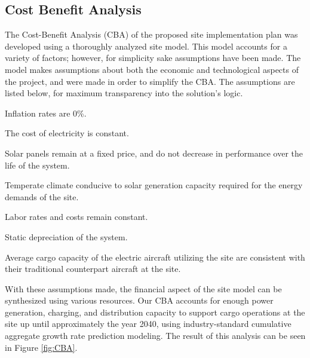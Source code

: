 \documentclass[../main.tex]{subfiles}
\begin{document}
\subsection{Cost Benefit Analysis} %
The Cost-Benefit Analysis (CBA) of the proposed site implementation plan was developed using a thoroughly analyzed site model. This model accounts for a variety of factors; however, for simplicity sake assumptions have been made. The model makes assumptions about both the economic and technological aspects of the project, and were made in order to simplify the CBA. The assumptions are listed below, for maximum transparency into the solution's logic.
\begin{enumerate}
\begin{singlespace}
    \item Inflation rates are 0\%.
    \item The cost of electricity is constant.
    \item Solar panels remain at a fixed price, and do not decrease in performance over the life of the system.
    \item Temperate climate conducive to solar generation capacity required for the energy demands of the site.
    \item Labor rates and costs remain constant.
    \item Static depreciation of the system.
    \item Average cargo capacity of the electric aircraft utilizing the site are consistent with their traditional counterpart aircraft at the site.
\end{singlespace}
\end{enumerate}

With these assumptions made, the financial aspect of the site model can be synthesized using various resources. Our CBA accounts for enough power generation, charging, and distribution capacity to support cargo operations at the site up until approximately the year 2040, using industry-standard cumulative aggregate growth rate prediction modeling. The result of this analysis can be seen in Figure \ref{fig:CBA}.
\begin{figure}[ht]
\end{figure}
\FloatBarrier
\end{document}

